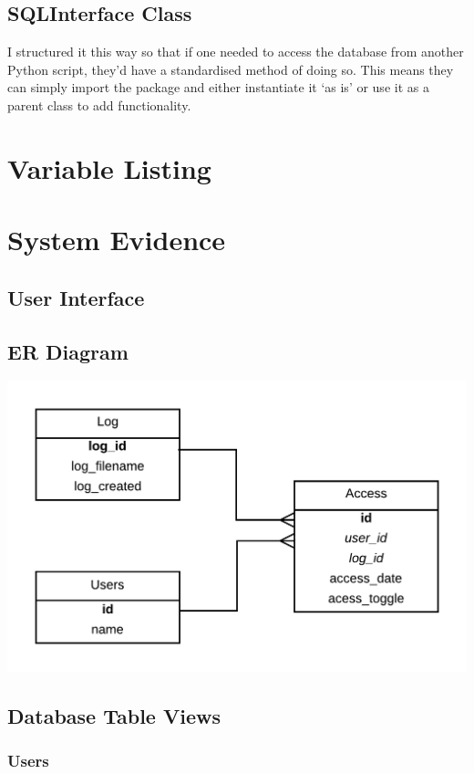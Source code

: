 \documentclass[a4paper]{article}
\begin{document}
\subsection{SQLInterface Class}
I structured it this way so that if one needed to access the database from another Python script, they'd
have a standardised method of doing so. This means they can simply import the package and either instantiate it `as is'
or use it as a parent class to add functionality.

\section{Variable Listing}
\section{System Evidence}
\subsection{User Interface}
\subsection{ER Diagram}
\begin{center}
\includegraphics[scale=0.3]{../shared_assets/diagrams/ERD.png}
\end{center}

\subsection{Database Table Views}
\subsubsection{Users}
\end{document}
